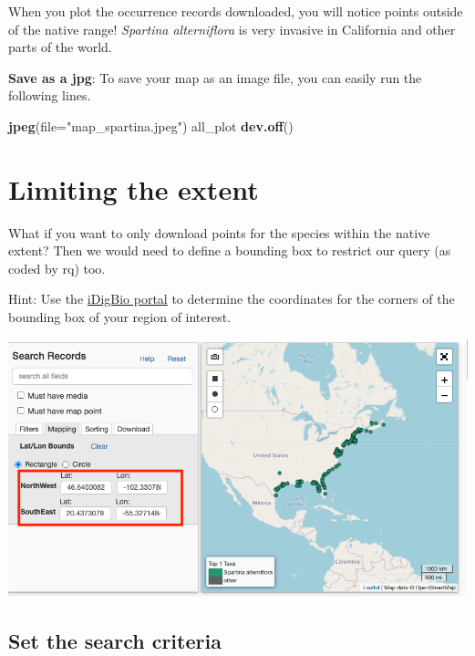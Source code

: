 \documentclass[
]{book}
\newenvironment{Shaded}{\begin{snugshade}}{\end{snugshade}}
\newcommand{\DataTypeTok}[1]{\textcolor[rgb]{0.13,0.29,0.53}{#1}}
\newcommand{\KeywordTok}[1]{\textcolor[rgb]{0.13,0.29,0.53}{\textbf{#1}}}
\newcommand{\NormalTok}[1]{#1}
\newcommand{\StringTok}[1]{\textcolor[rgb]{0.31,0.60,0.02}{#1}}
\begin{document}
When you plot the occurrence records downloaded, you will notice points outside of the native range! \emph{Spartina alterniflora} is very invasive in California and other parts of the world.

\textbf{Save as a jpg}: To save your map as an image file, you can easily run the following lines.

\begin{Shaded}
\begin{Highlighting}[]
\KeywordTok{jpeg}\NormalTok{(}\DataTypeTok{file=}\StringTok{"map\_spartina.jpeg"}\NormalTok{)}
\NormalTok{all\_plot}
\KeywordTok{dev.off}\NormalTok{()}
\end{Highlighting}
\end{Shaded}

\hypertarget{limiting-the-extent}{%
\section{Limiting the extent}\label{limiting-the-extent}}

What if you want to only download points for the species within the native extent? Then we would need to define a bounding box to restrict our query (as coded by rq) too.

Hint: Use the \href{https://www.idigbio.org/portal/search}{iDigBio portal} to determine the coordinates for the corners of the bounding box of your region of interest.

\begin{center}\includegraphics[width=0.7\linewidth]{img/BoundingBox2} \end{center}

\hypertarget{set-the-search-criteria}{%
\subsection*{Set the search criteria}\label{set-the-search-criteria}}
\end{document}
